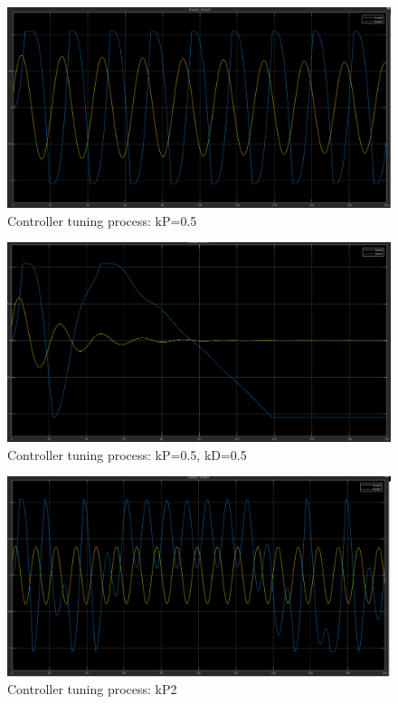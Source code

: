 \begin{figure}[H]
  \centering
  \includegraphics[scale=0.4]{graphics/Control/P0.5.png}
  \caption{Controller tuning process: kP=0.5}
  \label{fig:Controller tuning process: kP=0.5}
\end{figure}

\begin{figure}[H]
  \centering
  \includegraphics[scale=0.4]{graphics/Control/P0.5,D0.5.png}
  \caption{Controller tuning process: kP=0.5, kD=0.5}
  \label{fig:Controller tuning process: kP=0.5, kD=0.5}
\end{figure}


\begin{figure}[H]
  \centering
  \includegraphics[scale=0.4]{graphics/Control/p2.png}
  \caption{Controller tuning process: kP2}
  \label{fig:Controller tuning process: kP=2}
\end{figure}
